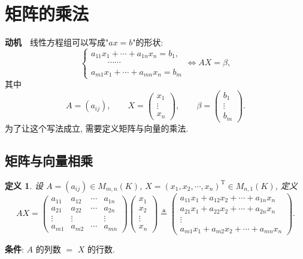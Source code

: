 \documentclass[UTF8,11pt]{ctexart}
\theoremstyle{cnthm}
\newtheorem{defn}[thm]{定义}
\begin{document}
\section{矩阵的乘法}

\textbf{动机}　线性方程组可以写成"$ax=b$"的形状:
\[
\begin{cases}
a_{11}x_1+\cdots+a_{1n}x_n=b_1,\\
\qquad\cdots\cdots\\
a_{m1}x_1+\cdots+a_{mn}x_n=b_m
\end{cases}
\iff
AX=\beta,
\]
其中
\[
A=(a_{ij}),\qquad X=\begin{pmatrix}x_1\\\vdots\\x_n\end{pmatrix},\qquad
\beta=\begin{pmatrix}b_1\\\vdots\\b_m\end{pmatrix}.
\]
为了让这个写法成立, 需要定义矩阵与向量的乘法.

\subsection{矩阵与向量相乘}

\begin{defn}
设 $A=(a_{ij})\in M_{m,n}(K)$, $X=(x_1,x_2,\cdots,x_n)^{\mathrm T}\in M_{n,1}(K)$, 定义
\[
AX=
\begin{pmatrix}
a_{11}&a_{12}&\cdots&a_{1n}\\
a_{21}&a_{22}&\cdots&a_{2n}\\
\vdots&\vdots&&\vdots\\
a_{m1}&a_{m2}&\cdots&a_{mn}
\end{pmatrix}
\begin{pmatrix}x_1\\x_2\\\vdots\\x_n\end{pmatrix}
\triangleq
\begin{pmatrix}
a_{11}x_1+a_{12}x_2+\cdots+a_{1n}x_n\\
a_{21}x_1+a_{22}x_2+\cdots+a_{2n}x_n\\
\vdots\\
a_{m1}x_1+a_{m2}x_2+\cdots+a_{mn}x_n
\end{pmatrix}.
\]
\end{defn}

\textbf{条件}: $A$ 的列数 $=$ $X$ 的行数.
\end{document}
